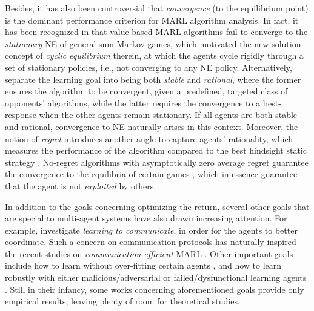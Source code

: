 Besides, it has  also been  controversial that \emph{convergence} (to the equilibrium point) is the dominant performance criterion for MARL algorithm analysis. In fact, it has been   recognized in \cite{zinkevich2006cyclic} that value-based MARL algorithms  fail to converge to the \emph{stationary} NE of general-sum Markov games, which motivated the new solution concept of \emph{cyclic equilibrium} therein, at which the agents  cycle rigidly through a set of stationary policies, i.e., not converging to any NE	policy. Alternatively, \cite{bowling2001rational,bowling2002multiagent}  separate the learning goal into being both \emph{stable} and \emph{rational}, where the former ensures the algorithm to be convergent, given  a predefined, targeted class of opponents' algorithms, while the latter requires the convergence to a best-response when the other agents remain stationary. If all agents are both stable and rational,  convergence to  NE naturally arises in this context.  
Moreover, the notion of \emph{regret}  introduces another angle to capture agents' rationality, which measures the performance of the algorithm compared to the best hindsight static strategy \cite{bowling2001rational,bowling2005convergence,blum2007learning}. No-regret algorithms with asymptotically zero average regret guarantee the convergence to the equilibria of certain games \cite{hart2001reinforcement,bowling2005convergence,zinkevich2008regret}, which in essence guarantee  that the agent is not \emph{exploited} by others. 

In addition to the goals concerning optimizing the return, several other goals that are special to multi-agent systems  
have also drawn increasing attention. For example, \cite{kasai2008learning,foerster2016learning,kim2019learning} investigate  \emph{learning to communicate}, in order for the agents to better coordinate. Such a concern on communication protocols has naturally inspired the recent studies on \emph{communication-efficient} MARL \cite{chen2018communication,lin2019communication,ren2019communication,kim2019message}. 
Other important goals  include how to learn without over-fitting certain agents \cite{he2016opponent,lowe2017multi,pmlr-v80-grover18a}, and  how to learn robustly  with either malicious/adversarial or failed/dysfunctional learning agents \cite{gao2018adversarial,li2019robust,zhang2019non}. 
Still in their infancy, some works concerning aforementioned goals provide  only empirical results, leaving plenty of room for theoretical studies.


